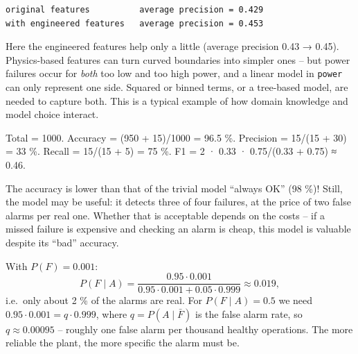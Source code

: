 \documentclass[
  letterpaper,
  DIV=11,
  numbers=noendperiod]{scrreprt}
\begin{document}
\begin{tcolorbox}
\begin{verbatim}
original features          average precision = 0.429
with engineered features   average precision = 0.453
\end{verbatim}

Here the engineered features help only a little (average precision 0.43
→ 0.45). Physics-based features can turn curved boundaries into simpler
ones -- but power failures occur for \emph{both} too low and too high
power, and a linear model in \texttt{power} can only represent one side.
Squared or binned terms, or a tree-based model, are needed to capture
both. This is a typical example of how domain knowledge and model choice
interact.

\end{tcolorbox}

\begin{tcolorbox}[enhanced jigsaw, left=2mm, title=\textcolor{quarto-callout-caution-color}{\faFire}\hspace{0.5em}{Solution to Exercise 5}, opacityback=0, breakable, rightrule=.15mm, arc=.35mm, toptitle=1mm, colbacktitle=quarto-callout-caution-color!10!white, opacitybacktitle=0.6, coltitle=black, colframe=quarto-callout-caution-color-frame, bottomrule=.15mm, leftrule=.75mm, bottomtitle=1mm, titlerule=0mm, toprule=.15mm, colback=white]

Total = 1000. Accuracy = (950 + 15)/1000 = 96.5 \%. Precision = 15/(15 +
30) = 33 \%. Recall = 15/(15 + 5) = 75 \%. F1 = 2 · 0.33 · 0.75/(0.33 +
0.75) ≈ 0.46.

The accuracy is lower than that of the trivial model ``always OK'' (98
\%)! Still, the model may be useful: it detects three of four failures,
at the price of two false alarms per real one. Whether that is
acceptable depends on the costs -- if a missed failure is expensive and
checking an alarm is cheap, this model is valuable despite its ``bad''
accuracy.

\end{tcolorbox}

\begin{tcolorbox}[enhanced jigsaw, left=2mm, title=\textcolor{quarto-callout-caution-color}{\faFire}\hspace{0.5em}{Solution to Exercise 6}, opacityback=0, breakable, rightrule=.15mm, arc=.35mm, toptitle=1mm, colbacktitle=quarto-callout-caution-color!10!white, opacitybacktitle=0.6, coltitle=black, colframe=quarto-callout-caution-color-frame, bottomrule=.15mm, leftrule=.75mm, bottomtitle=1mm, titlerule=0mm, toprule=.15mm, colback=white]

With \(P(F) = 0.001\):
\[P(F \mid A) = \frac{0.95 \cdot 0.001}{0.95 \cdot 0.001 + 0.05 \cdot 0.999} \approx 0.019,\]
i.e.~only about 2 \% of the alarms are real. For \(P(F \mid A) = 0.5\)
we need \(0.95 \cdot 0.001 = q \cdot 0.999\), where
\(q = P(A \mid \bar F)\) is the false alarm rate, so
\(q \approx 0.00095\) -- roughly one false alarm per thousand healthy
operations. The more reliable the plant, the more specific the alarm
must be.

\end{tcolorbox}
\end{document}
